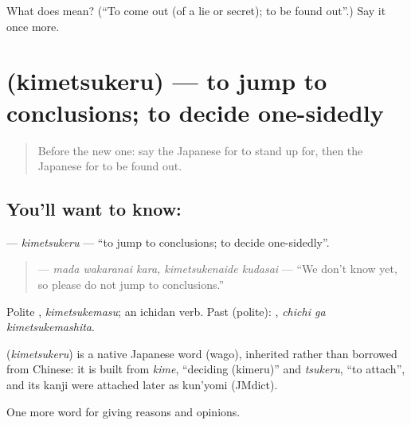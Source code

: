 \begin{tcolorbox}[breakable,colback=teal!4,colframe=teal!35!black,title={Before you move on}]
What does  mean? (\textquotedblleft{}To come out (of a lie or secret); to be found out\textquotedblright{}.) Say it once more.
\end{tcolorbox}
\section[\texorpdfstring{\ja{きめつける} (kimetsukeru)}{きめつける (kimetsukeru)}]{ (kimetsukeru) — to jump to conclusions; to decide one-sidedly}

\label{lesson:JA-C343-kimetsukeru}



\begin{quote}
Before the new one: say the Japanese for to stand up for, then the Japanese for to be found out.
\end{quote}

\subsection*{You'll want to know: }
\textbf{} — \emph{kimetsukeru} — \textquotedblleft{}to jump to conclusions; to decide one-sidedly\textquotedblright{}.

\begin{quote}
\textbf{  } — \emph{mada wakaranai kara, kimetsukenaide kudasai} — \textquotedblleft{}We don't know yet, so please do not jump to conclusions.\textquotedblright{}
\end{quote}

Polite \textbf{}, \emph{kimetsukemasu}; an ichidan verb. Past (polite): \textbf{ }, \emph{chichi ga kimetsukemashita}.

\begin{cousinweb}
\textbf{} (\emph{kimetsukeru}) is a native Japanese word (wago), inherited rather than borrowed from Chinese: it is built from \emph{kime}, \textquotedblleft{}deciding (kimeru)\textquotedblright{} and \emph{tsukeru}, \textquotedblleft{}to attach\textquotedblright{}, and its kanji were attached later as kun'yomi (JMdict).
\end{cousinweb}

\begin{grammarlens}[title={What you've built}]
One more word for giving reasons and opinions.
\end{grammarlens}

